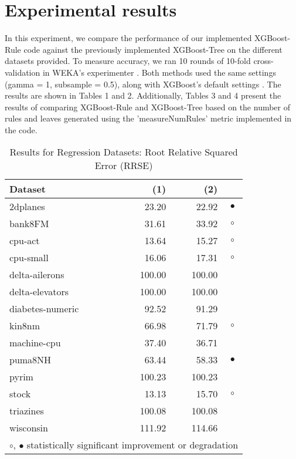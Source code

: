 \documentclass{article}
\begin{document}
\section{Experimental results}
In this experiment, we compare the performance of our implemented XGBoost-Rule code against the previously implemented XGBoost-Tree on the different datasets provided. To measure accuracy, we ran 10 rounds of 10-fold cross-validation in WEKA's experimenter \cite{weka_book}. Both methods used the same settings (gamma = 1, subsample = 0.5), along with XGBoost's default settings \cite{xgboostparameters}. The results are shown in Tables 1 and 2. Additionally, Tables 3 and 4 present the results of comparing XGBoost-Rule and XGBoost-Tree based on the number of rules and leaves generated using the 'measureNumRules' metric implemented in the code.
\begin{table}[H]
\caption{\label{labelname} Results for Regression Datasets: Root Relative Squared Error (RRSE)}
\footnotesize
{\centering \begin{tabular}{lrr@{\hspace{0.1cm}}c}
\\
\hline
Dataset & (1)& (2) & \\
\hline
2dplanes &  23.20 &  22.92 & $\bullet$\\
bank8FM &  31.61 &  33.92 &   $\circ$\\
cpu-act &  13.64 &  15.27 &   $\circ$\\
cpu-small &  16.06 &  17.31 &   $\circ$\\
delta-ailerons & 100.00 & 100.00 &          \\
delta-elevators & 100.00 & 100.00 &          \\
diabetes-numeric &  92.52 &  91.29 &          \\
kin8nm &  66.98 &  71.79 &   $\circ$\\
machine-cpu &  37.40 &  36.71 &          \\
puma8NH &  63.44 &  58.33 & $\bullet$\\
pyrim & 100.23 & 100.23 &          \\
stock &  13.13 &  15.70 &   $\circ$\\
triazines & 100.08 & 100.08 &          \\
wisconsin & 111.92 & 114.66 &          \\
\hline
\multicolumn{4}{c}{$\circ$, $\bullet$ statistically significant improvement or degradation}\\
\end{tabular} \footnotesize \par}
\end{table}
\end{document}

